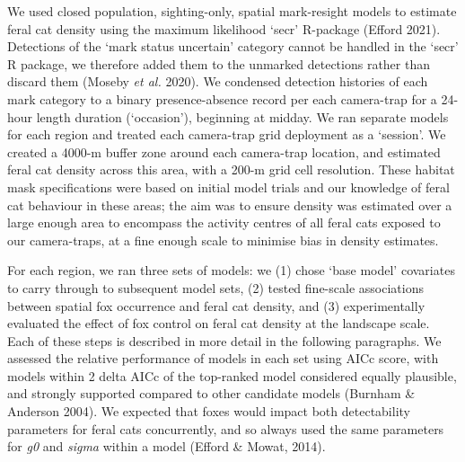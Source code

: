 \documentclass[]{elsarticle} %
\begin{document}
We used closed population, sighting-only, spatial mark-resight models to estimate feral cat density using the maximum likelihood `secr' R-package (Efford 2021). Detections of the `mark status uncertain' category cannot be handled in the `secr' R package, we therefore added them to the unmarked detections rather than discard them (Moseby \emph{et al.} 2020). We condensed detection histories of each mark category to a binary presence-absence record per each camera-trap for a 24-hour length duration (`occasion'), beginning at midday. We ran separate models for each region and treated each camera-trap grid deployment as a `session'. We created a 4000-m buffer zone around each camera-trap location, and estimated feral cat density across this area, with a 200-m grid cell resolution. These habitat mask specifications were based on initial model trials and our knowledge of feral cat behaviour in these areas; the aim was to ensure density was estimated over a large enough area to encompass the activity centres of all feral cats exposed to our camera-traps, at a fine enough scale to minimise bias in density estimates.

For each region, we ran three sets of models: we (1) chose `base model' covariates to carry through to subsequent model sets, (2) tested fine-scale associations between spatial fox occurrence and feral cat density, and (3) experimentally evaluated the effect of fox control on feral cat density at the landscape scale. Each of these steps is described in more detail in the following paragraphs. We assessed the relative performance of models in each set using AICc score, with models within 2 delta AICc of the top-ranked model considered equally plausible, and strongly supported compared to other candidate models (Burnham \& Anderson 2004). We expected that foxes would impact both detectability parameters for feral cats concurrently, and so always used the same parameters for \emph{g0} and \emph{sigma} within a model (Efford \& Mowat, 2014).
\end{document}
